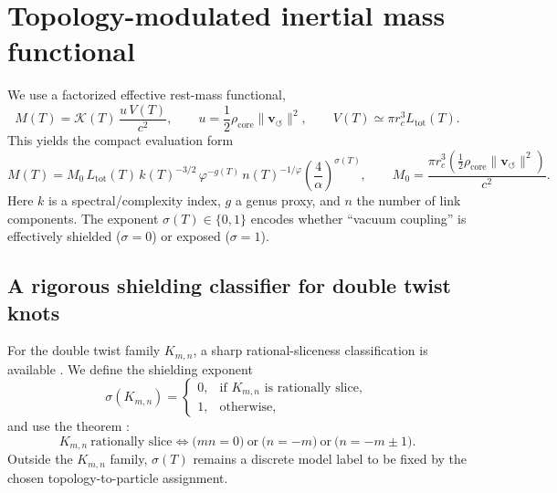 
\section{Topology-modulated inertial mass functional}

We use a factorized effective rest-mass functional,
\begin{equation}
M(T)=\mathcal{K}(T)\,\frac{u\,V(T)}{c^{2}},
\qquad
u=\frac12\rho_{\mathrm{core}}\lVert \mathbf{v}_{\circlearrowleft}\rVert^{2},
\qquad
V(T)\simeq \pi r_c^{3}L_{\mathrm{tot}}(T).
\end{equation}
This yields the compact evaluation form
\begin{equation}
M(T)=M_0\,L_{\mathrm{tot}}(T)\,k(T)^{-3/2}\,\varphi^{-g(T)}\,n(T)^{-1/\varphi}
\left(\frac{4}{\alpha}\right)^{\sigma(T)},
\qquad
M_0=\frac{\pi r_c^{3}\left(\frac12\rho_{\mathrm{core}}\lVert \mathbf{v}_{\circlearrowleft}\rVert^{2}\right)}{c^{2}}.
\end{equation}
Here $k$ is a spectral/complexity index, $g$ a genus proxy, and $n$ the number of link components. The exponent $\sigma(T)\in\{0,1\}$ encodes whether ``vacuum coupling'' is effectively shielded ($\sigma=0$) or exposed ($\sigma=1$).

\subsection{A rigorous shielding classifier for double twist knots}
For the double twist family $K_{m,n}$, a sharp rational-sliceness classification is available \cite{Lee2025DoubleTwist}. We define the shielding exponent
\begin{equation}
\sigma(K_{m,n})=
\begin{cases}
0, & \text{if }K_{m,n}\text{ is rationally slice},\\
1, & \text{otherwise},
\end{cases}
\end{equation}
and use the theorem \cite{Lee2025DoubleTwist}:
\begin{equation}
K_{m,n}\ \text{rationally slice} \iff
\big(mn=0\big)\ \text{or}\ \big(n=-m\big)\ \text{or}\ \big(n=-m\pm 1\big).
\end{equation}
Outside the $K_{m,n}$ family, $\sigma(T)$ remains a discrete model label to be fixed by the chosen topology-to-particle assignment.

